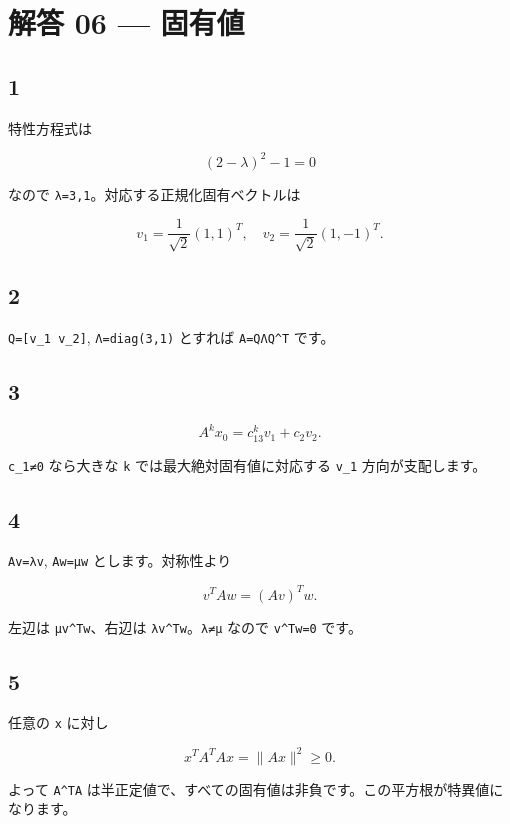 \documentclass[
  11pt,
  a4paper,
]{ltjsarticle}
\author{}
\date{}
\begin{document}
\hypertarget{ux89e3ux7b54-06-ux56faux6709ux5024}{%
\section{解答 06 --- 固有値}\label{ux89e3ux7b54-06-ux56faux6709ux5024}}

\hypertarget{section}{%
\subsection{1}\label{section}}

特性方程式は

\[
(2-\lambda)^2-1=0
\]

なので \texttt{λ=3,1}。対応する正規化固有ベクトルは

\[
v_1=\frac1{\sqrt2}(1,1)^T,\quad v_2=\frac1{\sqrt2}(1,-1)^T.
\]

\hypertarget{section-1}{%
\subsection{2}\label{section-1}}

\texttt{Q={[}v\_1\ v\_2{]}}, \texttt{Λ=diag(3,1)} とすれば
\texttt{A=QΛQ\^{}T} です。

\hypertarget{section-2}{%
\subsection{3}\label{section-2}}

\[
A^kx_0=c_13^kv_1+c_2v_2.
\]

\texttt{c\_1≠0} なら大きな \texttt{k} では最大絶対固有値に対応する
\texttt{v\_1} 方向が支配します。

\hypertarget{section-3}{%
\subsection{4}\label{section-3}}

\texttt{Av=λv}, \texttt{Aw=μw} とします。対称性より

\[
v^TAw=(Av)^Tw.
\]

左辺は \texttt{μv\^{}Tw}、右辺は \texttt{λv\^{}Tw}。\texttt{λ≠μ} なので
\texttt{v\^{}Tw=0} です。

\hypertarget{section-4}{%
\subsection{5}\label{section-4}}

任意の \texttt{x} に対し

\[
x^TA^TAx=\|Ax\|^2\ge0.
\]

よって \texttt{A\^{}TA}
は半正定値で、すべての固有値は非負です。この平方根が特異値になります。
\end{document}
